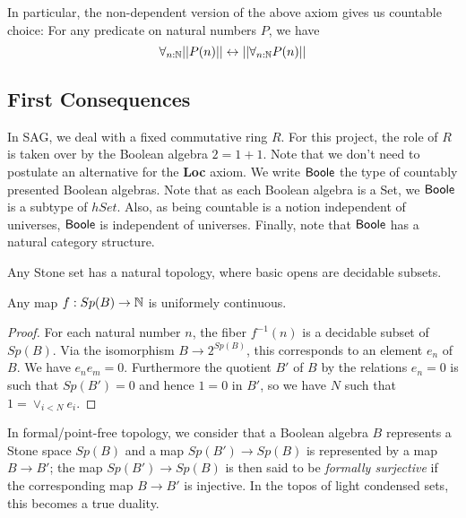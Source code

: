 \begin{corollary}
  In particular, the non-dependent version of the above axiom gives 
  us countable choice:
  For any predicate on natural numbers $P$, we have 
  \begin{equation}
    \forall_{n:\mathbb{N}} ||P(n) ||
    \leftrightarrow 
    || \forall_{n:\mathbb{N}} P(n) ||
  \end{equation}
\end{corollary}



\subsection{First Consequences}


In SAG, we deal with a fixed commutative ring $R$. For this project, the role of $R$ is taken over by 
the Boolean algebra $2 = 1+1$. Note that we don't need to postulate an alternative for the \textbf{Loc} axiom. 
We write $\mathsf{Boole}$ the type of countably presented Boolean algebras.
Note that as each Boolean algebra is a Set, we $\mathsf{Boole}$ is a subtype of $hSet$.
Also, as being countable is a notion independent of universes, $\mathsf{Boole}$ is independent of universes.
Finally, note that $\mathsf{Boole}$ has a natural category structure. 

Any Stone set has a natural topology, where basic opens are decidable subsets.

\medskip

\begin{proposition}
Any map $f: Sp(B)\rightarrow\mathbb{N}$ is uniformely continuous.
\end{proposition}  

\begin{proof}
  For each natural number $n$, the fiber $f^{-1}(n)$ is a decidable
  subset of $Sp(B)$. Via the isomorphism $B\rightarrow 2^{Sp(B)}$, this corresponds to an element $e_n$ of $B$. We have
  $e_ne_m = 0$. Furthermore the quotient $B'$ of $B$ by the relations $e_n = 0$ is such that $Sp(B') = 0$ and hence
  $1 = 0$ in $B'$, so we have $N$ such that $1 = \vee_{i<N}e_i$.
\end{proof}

\medskip

In formal/point-free topology, we consider that a Boolean algebra $B$ represents a Stone space $Sp(B)$ and a map
$Sp(B') \to Sp(B)$ is represented by a map $B\rightarrow B'$; the map $Sp(B')\to Sp(B)$ is then said to be
{\em formally surjective} if the corresponding map $B\to B'$ is injective. In the topos of light condensed sets,
this becomes a true duality.

